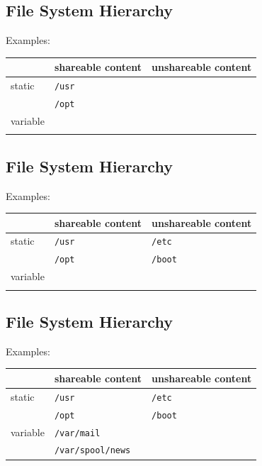 \documentclass[xga]{xdvislides}
\begin{document}
\subsection{File System Hierarchy}
Examples:
\\

\begin{center}
\begin{tabular}{| l | l | l |}
	\hline
	& shareable content & unshareable content \\
	\hline
	static   & \verb+/usr+ & \\
	         & \verb+/opt+ & \\
	\hline
	variable & & \\
	         & & \\
	\hline
\end{tabular}
\end{center}

\subsection{File System Hierarchy}
Examples:
\\

\begin{center}
\begin{tabular}{| l | l | l |}
	\hline
	& shareable content & unshareable content \\
	\hline
	static   & \verb+/usr+ & \verb+/etc+ \\
	         & \verb+/opt+ & \verb+/boot+ \\
	\hline
	variable & & \\
	         & & \\
	\hline
\end{tabular}
\end{center}

\subsection{File System Hierarchy}
Examples:
\\

\begin{center}
\begin{tabular}{| l | l | l |}
	\hline
	& shareable content & unshareable content \\
	\hline
	static   & \verb+/usr+ & \verb+/etc+ \\
	         & \verb+/opt+ & \verb+/boot+ \\
	\hline
	variable & \verb+/var/mail+ & \\
	         & \verb+/var/spool/news+ & \\
	\hline
\end{tabular}
\end{center}
\end{document}

